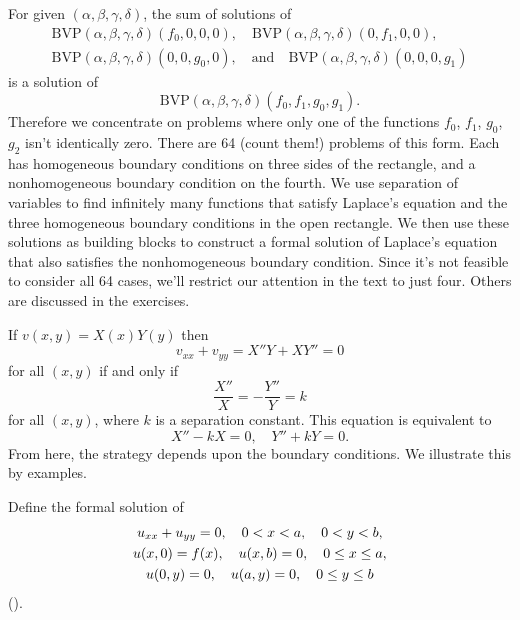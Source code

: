 For given $(\alpha,\beta,\gamma,\delta)$, the sum of
solutions of
\begin{gather*}
\mathrm{BVP}(\alpha,\beta,\gamma,\delta)(f_0,0,0,0),\quad
\mathrm{BVP}(\alpha,\beta,\gamma,\delta)(0,f_1,0,0),\\
\mathrm{BVP}(\alpha,\beta,\gamma,\delta)(0,0,g_0,0),
\quad\text{and}\quad
\mathrm{BVP}(\alpha,\beta,\gamma,\delta)(0,0,0,g_1)
\end{gather*}
is a solution of
\[
\mathrm{BVP}(\alpha,\beta,\gamma,\delta)(f_0,f_1,g_0,g_1).
\]
 Therefore we  concentrate
on problems where only one of the functions $f_0$,
$f_1$,
$g_0$, $g_2$ isn't  identically zero. There are 64 (count them!)
 problems of this form. Each has homogeneous
boundary conditions on three sides of the rectangle, and a
nonhomogeneous boundary condition on the fourth. We  use
separation of variables to find infinitely many functions
that satisfy
Laplace's equation and the three homogeneous boundary
conditions in the open rectangle.
 We then use
these solutions as  building blocks to construct a formal solution of
Laplace's equation that also  satisfies the  nonhomogeneous
boundary condition.
Since it's not feasible to consider
all 64 cases, we'll restrict our attention in the text to
just four.  Others are discussed in the exercises.

If $v(x,y)=X(x)Y(y)$ then
\[ v_{xx}+v_{yy}=X''Y+XY''=0 \]
for all
$(x,y)$ if and only if
\[ \frac{X''}{X}=-\frac{Y''}{Y}=k \]
for all
$(x,y)$, where $k$ is a separation constant. This equation is
equivalent to
\begin{equation} \label{eq:12.3.3}
X''-kX=0,\quad  Y''+kY=0.
\end{equation}
From here,
the strategy  depends upon the
boundary conditions. We  illustrate this by examples.

\begin{example}\label{example:12.3.1}
Define the formal solution of
\begin{gather}
u_{xx}+u_{yy}=0,\quad 0<x<a,\quad  0<y<b,\notag\\
u(x,0)=f(x),\quad u(x,b)=0,\quad 0\le x\le a,\label{eq:12.3.4}\\
u(0,y)=0,\quad u(a,y)=0,\quad 0\le y\le b\notag
\end{gather}
().
\end{example}


